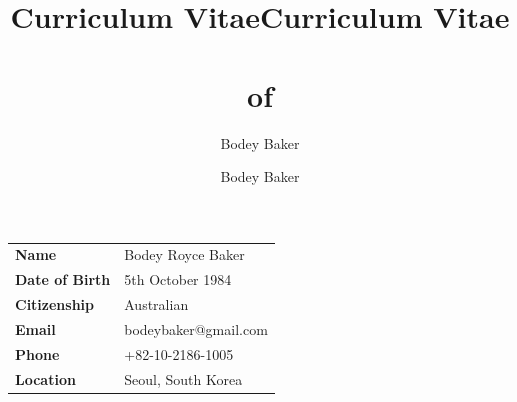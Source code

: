 \documentclass[10pt, a4paper]{report}
\title{Curriculum Vitae}
\author{Bodey Baker}
\title{Curriculum Vitae\\~\\of}
\author{Bodey Baker}%
\begin{document}


\begin{minipage}{0.82\linewidth}
\begin{tabular}{ll}
{\bf Name} & Bodey Royce Baker \\ 
{\bf Date of Birth} & 5th October 1984 \\
{\bf Citizenship} & Australian \\
{\bf Email} & bodeybaker@gmail.com \\
{\bf Phone} & +82-10-2186-1005 \\
{\bf Location} & Seoul, South Korea \\

\end{tabular}
\end{minipage}
\hfill
\begin{minipage}{0.6\linewidth}
{%
\setlength{\fboxsep}{0pt}%
\setlength{\fboxrule}{1pt}%
}%
\end{minipage}
\end{document}
